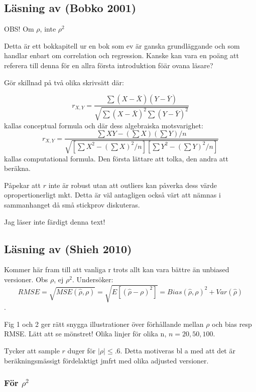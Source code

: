 \documentclass[]{article}
\begin{document}
\subsection{Läsning av (Bobko 2001)}\label{lasning-av-bobko2001}

OBS! Om \(\rho\), inte \(\rho^2\)

Detta är ett bokkapitell ur en bok som ev är ganska grundläggande och
som handlar enbart om correlation och regression. Kanske kan vara en
poäng att referera till denna för en allra första introduktion föär
ovana läsare?

Gör skillnad på två olika skrivsätt där:

\[r_{X,Y} = \frac{\sum(X - \bar{X})(Y - \bar{Y})}{\sqrt{\sum(X - \bar{X})^2\sum(Y-\bar{Y})^2}}\]
kallas conceptual formula och där dess algebraiska motsvarighet:
\[r_{X,Y} = \frac{\sum XY - (\sum X)(\sum Y)/n}{\sqrt{[\sum X^2 - (\sum X)^2/n][\sum Y^2 - (\sum Y)^2/n]}}\]
kallas computational formula. Den första lättare att tolka, den andra
att beräkna.

Påpekar att \(r\) inte är robust utan att outliers kan påverka dess
värde opropertionerligt mkt. Detta är väl antagligen också värt att
nämnas i sammanhanget då små stickprov diskuteras.

Jag läser inte färdigt denna text!

\subsection{Läsning av (Shieh 2010)}\label{lasning-av-shieh2010}

Kommer här fram till att vanliga r trots allt kan vara bättre än
unbiased versioner. Obs \(\rho\), ej \(\rho^2\). Undersöker:
\[RMSE = \sqrt{MSE(\hat{\rho}, \rho)} =\sqrt{E[(\hat{\rho} - \rho)^2]} = Bias(\hat{\rho}, \rho)^2 + Var(\hat{\rho})\].

Fig 1 och 2 ger rätt snygga illustrationer över förhållande mellan
\(\rho\) och bias resp RMSE. Lätt att se mönstret! Olika linjer för
olika n, \(n = 20, 50, 100\).

Tycker att sample \(r\) duger för \(\mid \rho \mid \leq .6\). Detta
motiveras bl a med att det är beräkningsmässigt fördelaktigt jmfrt med
olika adjusted versioner.

\subsubsection{\texorpdfstring{För
\(\rho^2\)}{För \textbackslash{}rho\^{}2}}\label{for-rho2}
\end{document}
